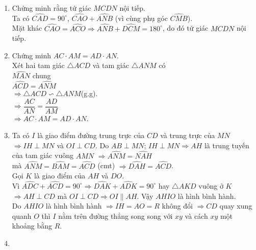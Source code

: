 \begin{ex}
{	\begin{enumerate}
\item Chứng minh rằng tứ giác $MCDN$ nội tiếp.\\
Ta có $\widehat{CAD}=90^{\circ}$, $\widehat{CAO}+\widehat{ANB}$ (vì cùng phụ góc $\widehat{CMB}$).\\
Mặt khác $\widehat{CAO}=\widehat{ACO} \Rightarrow \widehat{ANB}+\widehat{DCM}=180^{\circ}$, do đó tứ giác $MCDN$ nội tiếp.
\item Chứng minh $AC \cdot AM=AD \cdot AN$.\\
Xét hai tam giác $\triangle ACD$ và tam giác $\triangle ANM$ có\\
$\widehat{MAN}$ chung\\
$\widehat{ACD}=\widehat{ANM}$\\
$\Rightarrow \triangle ACD \backsim \triangle ANM$(g.g).\\
$\Rightarrow \dfrac{AC}{AN}=\dfrac{AD}{AM}$\\
$\Rightarrow AC \cdot AM=AD \cdot AN$.
\item  Ta có
$I$ là giao điểm đường trung trực của $CD$ và trung trực của $MN$ $\Rightarrow IH \perp MN$ và $OI \perp CD$.
Do $AB \perp MN$; $IH \perp MN \Rightarrow AH$ là trung tuyến của tam giác vuông $AMN$ $\Rightarrow \widehat{ANM}=\widehat{NAH}$\\
mà $\widehat{ANM}=\widehat{BAM}=\widehat{ACD}$ (cmt) $\Rightarrow \widehat{DAH}=\widehat{ACD}$.\\
Gọi $K$ là giao điểm của $AH$ và $DO$.\\
Vì $\widehat{ADC}+\widehat{ACD}=90^{\circ} \Rightarrow \widehat{DAK}+\widehat{ADK}=90^{\circ}$ hay $\triangle AKD$ vuông ở $K$ $\Rightarrow AH \perp CD$ mà $OI \perp CD \Rightarrow OI \parallel AH$. Vậy $AHIO$ là hình bình hành.\\
Do $AHIO$ là hình bình hành $\Rightarrow IH=AO=R$ không đổi $\Rightarrow CD$ quay xung quanh $O$ thì $I$ nằm trên đường thẳng song song với $xy$ và cách $xy$ một khoảng bằng $R$.
\item  {}
\end{enumerate}}
\end{ex}
